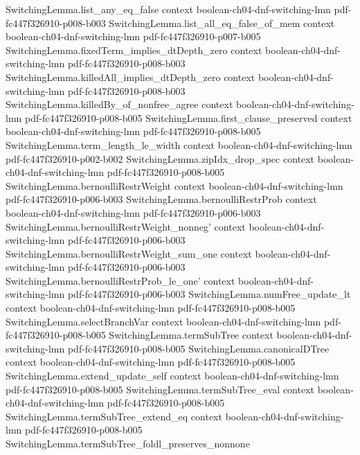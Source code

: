 \begin{lemma}
  {SwitchingLemma.list_any_eq_false}
  {context}
  {boolean-ch04-dnf-switching-lmn}
  {pdf-fc447f326910-p008-b003}
\proofstep
  {SwitchingLemma.list_all_eq_false_of_mem}
  {context}
  {boolean-ch04-dnf-switching-lmn}
  {pdf-fc447f326910-p007-b005}
\proofstep
  {SwitchingLemma.fixedTerm_implies_dtDepth_zero}
  {context}
  {boolean-ch04-dnf-switching-lmn}
  {pdf-fc447f326910-p008-b003}
\proofstep
  {SwitchingLemma.killedAll_implies_dtDepth_zero}
  {context}
  {boolean-ch04-dnf-switching-lmn}
  {pdf-fc447f326910-p008-b003}
\proofstep
  {SwitchingLemma.killedBy_of_nonfree_agree}
  {context}
  {boolean-ch04-dnf-switching-lmn}
  {pdf-fc447f326910-p008-b005}
\proofstep
  {SwitchingLemma.first_clause_preserved}
  {context}
  {boolean-ch04-dnf-switching-lmn}
  {pdf-fc447f326910-p008-b005}
\proofstep
  {SwitchingLemma.term_length_le_width}
  {context}
  {boolean-ch04-dnf-switching-lmn}
  {pdf-fc447f326910-p002-b002}
\proofstep
  {SwitchingLemma.zipIdx_drop_spec}
  {context}
  {boolean-ch04-dnf-switching-lmn}
  {pdf-fc447f326910-p008-b005}
\proofstep
  {SwitchingLemma.bernoulliRestrWeight}
  {context}
  {boolean-ch04-dnf-switching-lmn}
  {pdf-fc447f326910-p006-b003}
\proofstep
  {SwitchingLemma.bernoulliRestrProb}
  {context}
  {boolean-ch04-dnf-switching-lmn}
  {pdf-fc447f326910-p006-b003}
\proofstep
  {SwitchingLemma.bernoulliRestrWeight_nonneg'}
  {context}
  {boolean-ch04-dnf-switching-lmn}
  {pdf-fc447f326910-p006-b003}
\proofstep
  {SwitchingLemma.bernoulliRestrWeight_sum_one}
  {context}
  {boolean-ch04-dnf-switching-lmn}
  {pdf-fc447f326910-p006-b003}
\proofstep
  {SwitchingLemma.bernoulliRestrProb_le_one'}
  {context}
  {boolean-ch04-dnf-switching-lmn}
  {pdf-fc447f326910-p006-b003}
\proofstep
  {SwitchingLemma.numFree_update_lt}
  {context}
  {boolean-ch04-dnf-switching-lmn}
  {pdf-fc447f326910-p008-b005}
\proofstep
  {SwitchingLemma.selectBranchVar}
  {context}
  {boolean-ch04-dnf-switching-lmn}
  {pdf-fc447f326910-p008-b005}
\proofstep
  {SwitchingLemma.termSubTree}
  {context}
  {boolean-ch04-dnf-switching-lmn}
  {pdf-fc447f326910-p008-b005}
\proofstep
  {SwitchingLemma.canonicalDTree}
  {context}
  {boolean-ch04-dnf-switching-lmn}
  {pdf-fc447f326910-p008-b005}
\proofstep
  {SwitchingLemma.extend_update_self}
  {context}
  {boolean-ch04-dnf-switching-lmn}
  {pdf-fc447f326910-p008-b005}
\proofstep
  {SwitchingLemma.termSubTree_eval}
  {context}
  {boolean-ch04-dnf-switching-lmn}
  {pdf-fc447f326910-p008-b005}
\proofstep
  {SwitchingLemma.termSubTree_extend_eq}
  {context}
  {boolean-ch04-dnf-switching-lmn}
  {pdf-fc447f326910-p008-b005}
\proofstep
  {SwitchingLemma.termSubTree_foldl_preserves_nonnone}

\end{lemma}
